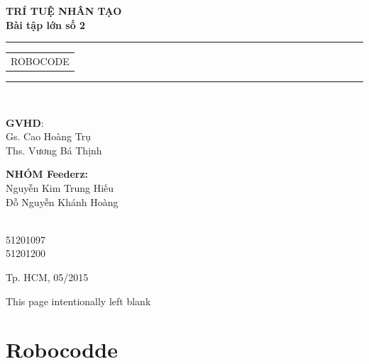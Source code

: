 \documentclass[14pt]{article}
\begin{document}
\vspace{1cm}

\begin{flushleft}
\Large \bfseries TRÍ TUỆ NHÂN TẠO\\
Bài tập lớn số 2\\[0.5cm]
\end{flushleft}
\rule{\textwidth}{1pt}
\vspace{2pt}
\begin{center}
\huge
\begin{tabular}{@{}l}
ROBOCODE\\[10pt]
\end{tabular}
\end{center}
\rule{\textwidth}{1pt}\\[1cm]

\vspace{1cm}

\begin{minipage}[t]{0.60\linewidth}
\textbf{GVHD}: \\
Gs. Cao Hoàng Trụ\\
Ths. Vương Bá Thịnh

\end{minipage}
\begin{minipage}[t]{0.25\linewidth}
\textbf{NHÓM Feederz:}\\
Nguyễn Kim Trung Hiếu\\
Đỗ Nguyễn Khánh Hoàng\\
\end{minipage}
\begin{minipage}[t]{0.20\linewidth}
\textbf{}\\
51201097\\
51201200\\
\end{minipage}
\begin{center}

\vspace{2cm}
{Tp. HCM, 05/2015}

\end{center}

\newpage
\thispagestyle{empty}
\emph{ }
\newpage
\thispagestyle{empty}
\tableofcontents
\thispagestyle{empty}

\newpage
\thispagestyle{empty}
\listoffigures

\newpage
\thispagestyle{empty}
\begin{center}
This page intentionally left blank
\end{center}
\newpage
\section{Robocodde}
\end{document}
